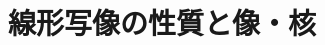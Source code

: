 \documentclass[./topic_linear-algebra]{subfiles}
\begin{document}
\chapter{線形写像の性質と像・核}


\end{document}
